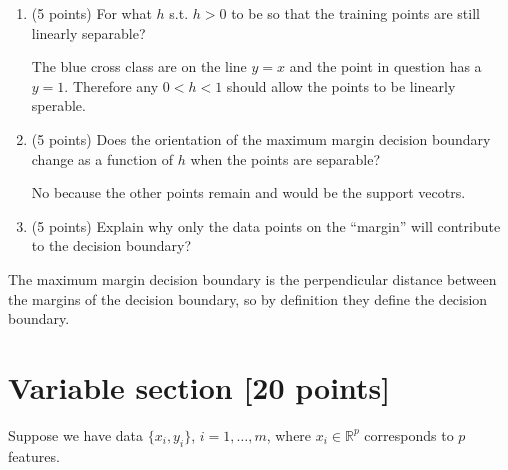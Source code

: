 \documentclass[a4paper,12pt,fleqn]{article}
\begin{document}
\begin{enumerate}
\item (5 points) For what $h$ s.t. $h > 0$ to be so that the training points are still linearly separable?

\vspace{.15in}
The blue cross class are on the line $y=x$ and the point in question has a $y=1$.  Therefore any $0 < h < 1$ should allow the points to be linearly sperable.
\vspace{.15in}

\item (5 points) Does the orientation of the maximum margin decision boundary change as a function of $h$ when the points are separable?

\vspace{.15in}
No because the other points remain and would be the support vecotrs.  
\vspace{.15in}

\item (5 points) Explain why only the data points on the ``margin'' will contribute to the decision boundary?
\end{enumerate}

\vspace{.15in}
The maximum margin decision boundary is the perpendicular distance between the margins of the decision boundary, so by definition they define the decision boundary.
\vspace{.15in}

\clearpage

\section{Variable section [20 points]}

Suppose we have data $\{x_i, y_i\}$, $i = 1, \ldots, m$, where $x_i \in \mathbb R^p$ corresponds to $p$ features.
\end{document}
